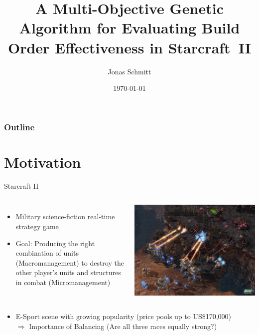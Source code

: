 \documentclass{beamer}
\title{A Multi-Objective Genetic Algorithm for Evaluating Build Order Effectiveness in Starcraft~II} %
\author{Jonas Schmitt} %
\date{\today} %
\begin{document}
\begin{frame}
\titlepage %
\end{frame}

\begin{frame}
\frametitle{Outline} %
\tableofcontents %
\end{frame}
\section{Motivation}
\begin{frame}{Starcraft II}
\begin{columns}[c] %
    \begin{itemize}
		\item Military science-fiction real-time strategy game
		\item \alert{Goal:} Producing the right combination of units (\alert{Macromanagement}) to destroy the other player's units and structures in combat (\alert{Micromanagement})
	\end{itemize}
    	\includegraphics[width=1.0\linewidth]{starcraft-2-screenshot.jpg}
\end{columns}
\begin{itemize}
\item E-Sport scene with growing popularity (price pools up to US\$170,000)
\\ $\Rightarrow$ Importance of \alert{Balancing} (Are all three races equally strong?) 
\end{itemize}
\end{frame}
\end{document}
